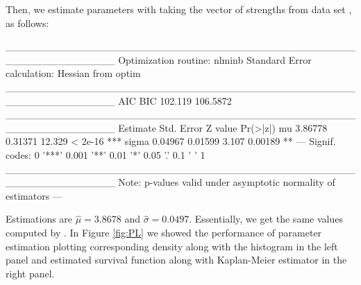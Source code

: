 \documentclass[nojss]{jss}
\begin{document}
Then, we estimate parameters with  taking the vector of strengths from data set , as follows:

\begin{Schunk}
\begin{Soutput}
_______________________________________________________________
Optimization routine: nlminb 
Standard Error calculation: Hessian from optim 
_______________________________________________________________
      AIC      BIC
  102.119 106.5872
_______________________________________________________________
      Estimate  Std. Error Z value Pr(>|z|)    
mu      3.86778    0.31371  12.329  < 2e-16 ***
sigma   0.04967    0.01599   3.107  0.00189 ** 
---
Signif. codes:  0 '***' 0.001 '**' 0.01 '*' 0.05 '.' 0.1 ' ' 1
_______________________________________________________________
Note: p-values valid under asymptotic normality of estimators 
---
\end{Soutput}
\end{Schunk}

Estimations are $\hat{\mu}=3.8678$ and $\hat{\sigma}=0.0497$. Essentially, we get the same values computed by \cite{Ghitany2013}. In Figure \ref{fig:PL} we showed the performance of parameter estimation plotting corresponding density along with the histogram in the left panel and estimated survival function along with Kaplan-Meier estimator in the right panel.
\end{document}
